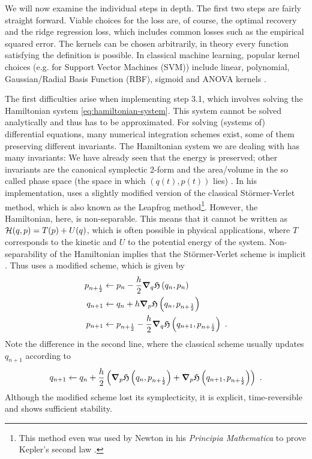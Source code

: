 We will now examine the individual steps in depth.
The first two steps are fairly straight forward.
Viable choices for the loss are, of course, the optimal recovery and the ridge regression loss, which includes common losses such as the empirical squared error.
The kernels can be chosen arbitrarily, in theory every function satisfying the definition is possible.
In classical machine learning, popular kernel choices (e.g. for Support Vector Machines (SVM)) include linear, polynomial, Gaussian/Radial Basis Function (RBF), sigmoid and ANOVA kernels \cite{souza21}.

The first difficulties arise when implementing step 3.1, which involves solving the Hamiltonian system \ref{eq:hamiltonian-system}.
This system cannot be solved analytically and thus has to be approximated.
For solving (systems of) differential equations, many numerical integration schemes exist, some of them preserving different invariants.
The Hamiltonian system we are dealing with has many invariants:
We have already seen that the energy is preserved; other invariants are the canonical symplectic 2-form \cite{marsden10} and the area/volume in the so called phase space (the space in which $(q(t), p(t))$ lies) \cite{hairer06}.
In his implementation, \citet{owhadi20} uses a slightly modified version of the classical Störmer-Verlet method, which is also known as the Leapfrog method\footnote{This method even was used by Newton in his \emph{Principia Mathematica} to prove Kepler's second law \cite{hairer03}.}.
However, the Hamiltonian, here, is non-separable.
This means that it cannot be written as $\mathcal{H}(q, p) = T(p) + U(q)$, which is often possible in physical applications, where $T$ corresponds to the kinetic and $U$ to the potential energy of the system.
Non-separability of the Hamiltonian implies that the Störmer-Verlet scheme is implicit \cite{hairer06}.
Thus \citet{owhadi20} uses a modified scheme, which is given by
\begin{align}
	p_{n+\frac{1}{2}} &\gets p_n - \frac{h}{2} \grad_q\mathfrak{H}\left(q_n, p_n\right) \label{eq:leapfrog-p.5}\\
	q_{n+1} &\gets q_n + h \grad_p\mathfrak{H}\left(q_n, p_{n+\frac{1}{2}}\right)\\
	p_{n+1} &\gets p_{n+\frac{1}{2}} - \frac{h}{2} \grad_q\mathfrak{H}\left(q_{n+1}, p_{n+\frac{1}{2}}\right) \label{eq:leapfrog-p1}\ .
\end{align}
Note the difference in the second line, where the classical scheme usually updates $q_{n+1}$ according to 
\begin{equation}
q_{n+1} \gets q_n + \frac{h}{2} \left(\grad_p\mathfrak{H}\left(q_n, p_{n+\frac{1}{2}}\right) + \grad_p\mathfrak{H}\left(q_{n+1}, p_{n+\frac{1}{2}}\right)\right) \ .
\end{equation}
Although the modified scheme lost its symplecticity, it is explicit, time-reversible and shows sufficient stability.

